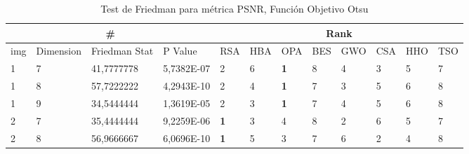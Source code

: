 \documentclass[conference]{IEEEtran}
\begin{document}
\begin{table}[]
	\centering
	\caption{Test de Friedman para métrica PSNR, Función Objetivo Otsu}
	\begin{tabular}{|llll|llllllll|}
		\hline
		\multicolumn{4}{|c|}{\#} & \multicolumn{8}{c|}{Rank} \\ \hline
		\multicolumn{1}{|l|}{img} & \multicolumn{1}{l|}{Dimension} & \multicolumn{1}{l|}{Friedman Stat} & P Value    & \multicolumn{1}{l|}{RSA}        & \multicolumn{1}{l|}{HBA}        & \multicolumn{1}{l|}{OPA}        & \multicolumn{1}{l|}{BES} & \multicolumn{1}{l|}{GWO}        & \multicolumn{1}{l|}{CSA}        & \multicolumn{1}{l|}{HHO} & TSO                    \\ \hline 
		\multicolumn{1}{|l|}{1}   & \multicolumn{1}{l|}{7}         & \multicolumn{1}{l|}{41,7777778}    & 5,7382E-07 & \multicolumn{1}{l|}{2}          & \multicolumn{1}{l|}{6}          & \multicolumn{1}{l|}{\textbf{1}} & \multicolumn{1}{l|}{8}   & \multicolumn{1}{l|}{4}          & \multicolumn{1}{l|}{3}          & \multicolumn{1}{l|}{5}   & 7                      \\ \hline
		\multicolumn{1}{|l|}{1}   & \multicolumn{1}{l|}{8}         & \multicolumn{1}{l|}{57,7222222}    & 4,2943E-10 & \multicolumn{1}{l|}{2}          & \multicolumn{1}{l|}{4}          & \multicolumn{1}{l|}{\textbf{1}} & \multicolumn{1}{l|}{7}   & \multicolumn{1}{l|}{3}          & \multicolumn{1}{l|}{5}          & \multicolumn{1}{l|}{6}   & 8                      \\ \hline
		\multicolumn{1}{|l|}{1}   & \multicolumn{1}{l|}{9}         & \multicolumn{1}{l|}{34,5444444}    & 1,3619E-05 & \multicolumn{1}{l|}{2}          & \multicolumn{1}{l|}{3}          & \multicolumn{1}{l|}{\textbf{1}} & \multicolumn{1}{l|}{7}   & \multicolumn{1}{l|}{4}          & \multicolumn{1}{l|}{5}          & \multicolumn{1}{l|}{6}   & 8                      \\ \hline
		\multicolumn{1}{|l|}{2}   & \multicolumn{1}{l|}{7}         & \multicolumn{1}{l|}{35,4444444}    & 9,2259E-06 & \multicolumn{1}{l|}{\textbf{1}} & \multicolumn{1}{l|}{3}          & \multicolumn{1}{l|}{4}          & \multicolumn{1}{l|}{8}   & \multicolumn{1}{l|}{2}          & \multicolumn{1}{l|}{6}          & \multicolumn{1}{l|}{5}   & 7                      \\ \hline
		\multicolumn{1}{|l|}{2}   & \multicolumn{1}{l|}{8}         & \multicolumn{1}{l|}{56,9666667}    & 6,0696E-10 & \multicolumn{1}{l|}{\textbf{1}} & \multicolumn{1}{l|}{5}          & \multicolumn{1}{l|}{3}          & \multicolumn{1}{l|}{7}   & \multicolumn{1}{l|}{6}          & \multicolumn{1}{l|}{2}          & \multicolumn{1}{l|}{4}   & 8                      \\ \hline

\end{tabular}
\end{table}
\end{document}
